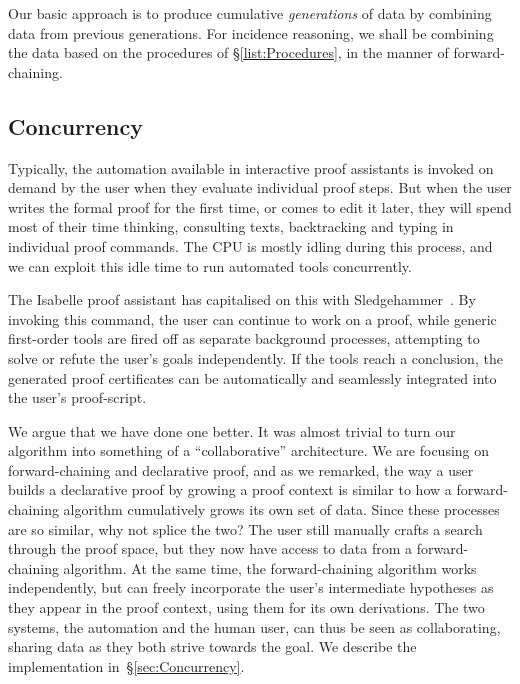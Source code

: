 Our basic approach is to produce cumulative \emph{generations} of data by combining data from previous generations. For incidence reasoning, we shall be combining the data based on the procedures of \S\ref{list:Procedures}, in the manner of forward-chaining.

\subsection{Concurrency}\label{sec:NaiveConcurrency}
Typically, the automation available in interactive proof assistants is invoked on demand by the user when they evaluate individual proof steps. But when the user writes the formal proof for the first time, or comes to edit it later, they will spend most of their time thinking, consulting texts, backtracking and typing in individual proof commands. The CPU is mostly idling during this process, and we can exploit this idle time to run automated tools concurrently.

The Isabelle proof assistant has capitalised on this with Sledgehammer~\cite{IsabelleSledgehammer}. By invoking this command, the user can continue to work on a proof, while generic first-order tools are fired off as separate background processes, attempting to solve or refute the user's goals independently. If the tools reach a conclusion, the generated proof certificates can be automatically and seamlessly integrated into the user's proof-script. 

We argue that we have done one better. It was almost trivial to turn our algorithm into something of a ``collaborative'' architecture. We are focusing on forward-chaining and declarative proof, and as we remarked, the way a user builds a declarative proof by growing a proof context is similar to how a forward-chaining algorithm cumulatively grows its own set of data. Since these processes are so similar, why not splice the two? The user still manually crafts a search through the proof space, but they now have access to data from a forward-chaining algorithm. At the same time, the forward-chaining algorithm works independently, but can freely incorporate the user's intermediate hypotheses as they appear in the proof context, using them for its own derivations. The two systems, the automation and the human user, can thus be seen as collaborating, sharing data as they both strive towards the goal. We describe the implementation in~\S\ref{sec:Concurrency}.


